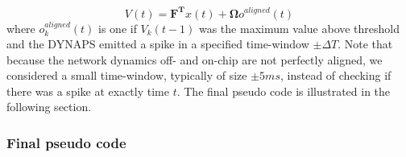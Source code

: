 \documentclass[twoside,11pt]{article}
\begin{document}
\begin{equation*}
   V(t) = \mathbf{F^T}x(t) + \mathbf{\Omega}o^{aligned}(t)
\end{equation*}
where $o^{aligned}_k(t)$ is one if $V_k(t-1)$ was the maximum value above threshold
and the DYNAPS emitted a spike in a specified time-window $\pm \Delta T$. Note that because
the network dynamics off- and on-chip are not perfectly aligned, we considered a small
time-window, typically of size $\pm 5ms$, instead of checking if there was a spike at exactly
time $t$.
The final pseudo code is illustrated in the following section.

\newpage

\subsubsection{Final pseudo code} \label{sec:pseudo-code}
\end{document}
